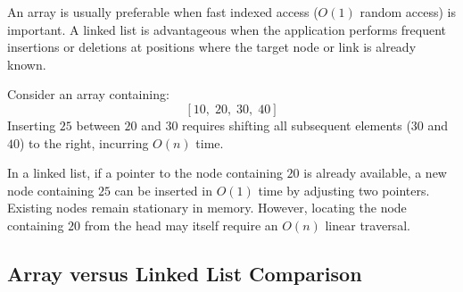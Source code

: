 An array is usually preferable when fast indexed access ($O(1)$ random access) is important. A linked list is advantageous when the application performs frequent insertions or deletions at positions where the target node or link is already known.

Consider an array containing:
\[
[10, \; 20, \; 30, \; 40]
\]
Inserting $25$ between $20$ and $30$ requires shifting all subsequent elements ($30$ and $40$) to the right, incurring $O(n)$ time.

In a linked list, if a pointer to the node containing $20$ is already available, a new node containing $25$ can be inserted in $O(1)$ time by adjusting two pointers. Existing nodes remain stationary in memory. However, locating the node containing $20$ from the head may itself require an $O(n)$ linear traversal.

\subsection{Array versus Linked List Comparison}

